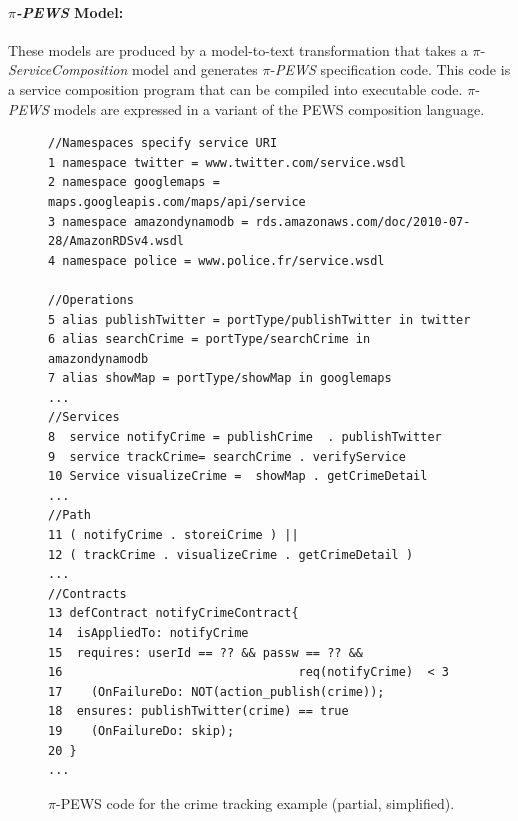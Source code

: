\paragraph*{$\pi$\textit{-PEWS} Model:}
These models are produced by a model-to-text transformation that takes a $\pi$-\textit{ServiceComposition} model and generates $\pi$-\textit{PEWS} specification code.
This code is a service composition program that can be compiled into executable code.
$\pi$-\textit{PEWS} models are expressed in a variant of the PEWS composition language.

\begin{figure}[t]
\footnotesize
\begin{verbatim}
//Namespaces specify service URI
1 namespace twitter = www.twitter.com/service.wsdl
2 namespace googlemaps = maps.googleapis.com/maps/api/service
3 namespace amazondynamodb = rds.amazonaws.com/doc/2010-07-28/AmazonRDSv4.wsdl
4 namespace police = www.police.fr/service.wsdl

//Operations 
5 alias publishTwitter = portType/publishTwitter in twitter
6 alias searchCrime = portType/searchCrime in amazondynamodb 
7 alias showMap = portType/showMap in googlemaps 
...
//Services
8  service notifyCrime = publishCrime  . publishTwitter 
9  service trackCrime= searchCrime . verifyService
10 Service visualizeCrime =  showMap . getCrimeDetail
...
//Path
11 ( notifyCrime . storeiCrime ) || 
12 ( trackCrime . visualizeCrime . getCrimeDetail )
...
//Contracts
13 defContract notifyCrimeContract{
14	isAppliedTo: notifyCrime
15	requires: userId == ?? && passw == ?? && 
16	                               req(notifyCrime)  < 3
17 	  (OnFailureDo: NOT(action_publish(crime));
18	ensures: publishTwitter(crime) == true
19 	  (OnFailureDo: skip);
20 }
...
\end{verbatim}
\caption{$\pi$-PEWS code for the crime tracking example (partial, simplified).\label{fig:pewscontract} }
\end{figure}

